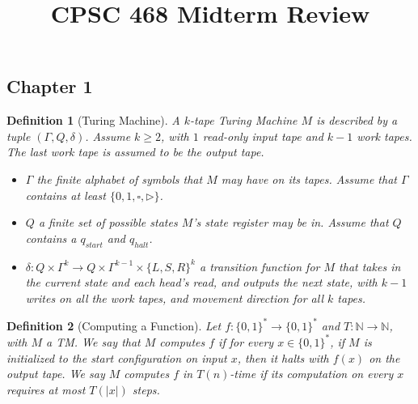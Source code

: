 \documentclass[10pt]{article}
\title{CPSC 468 Midterm Review}
\author{}
\date{}
\newtheorem{definition}{Definition}[section]
\begin{document}
\maketitle

\newcommand{\E}{\mathrm{E}}
\newcommand{\Var}{\mathrm{Var}}
\newcommand{\Real}{\mathrm{Re}}
\newcommand{\Imag}{\mathrm{Im}}
\newcommand{\res}{\mathrm{res}}
\newcommand{\NP}{\mathrm{NP}}
\newcommand{\NPC}{\mathrm{NP\mhyphen Complete}}
\newcommand{\coNP}{\mathrm{coNP}}
\newcommand{\coNPC}{\mathrm{coNP\mhyphen Complete}}
\newcommand{\DP}{\mathrm{DP}}
\newcommand{\PTIME}{\mathrm{P}}
\newcommand{\AL}{\mathrm{AL}}
\newcommand{\INDSET}{\mathrm{INDSET}}
\newcommand{\NOTINDSET}{\overline{\mathrm{INDSET}}}
\newcommand{\EXACTINDSET}{\mathrm{EXACT\mhyphen INDSET}}
\newcommand{\SAT}{\mathrm{SAT}}
\newcommand{\UNSAT}{\overline{\mathrm{SAT}}}
\newcommand{\ACCEPT}{\mathrm{ACCEPT}}
\newcommand{\REJECT}{\mathrm{REJECT}}

\subsection*{Chapter 1}
\begin{definition}[Turing Machine]
  A $k$-tape Turing Machine $M$ is described by a tuple $(\Gamma, Q, \delta)$.
  Assume $k \geq 2$, with $1$ read-only input tape and $k - 1$ work tapes.
  The last work tape is assumed to be the output tape.
  \begin{itemize}
    \item
      $\Gamma$ the finite alphabet of symbols that $M$ may have on its tapes.
      Assume that $\Gamma$ contains at least $\{0,1,\square,\triangleright\}$.

    \item
      $Q$ a finite set of possible states $M$'s state register may be in.
      Assume that $Q$ contains a $q_{start}$ and $q_{halt}$.

    \item
      $\delta : Q \times \Gamma^k \to Q
      \times \Gamma^{k - 1} \times \{L, S, R\}^k$ a transition function for
      $M$ that takes in the current state and each head's read, and outputs
      the next state, with $k - 1$ writes on all the work tapes, and movement
      direction for all $k$ tapes.
  \end{itemize}
\end{definition}

\begin{definition}[Computing a Function]
  Let $f : \{0, 1\}^\ast \to \{0, 1\}^\ast$ and
  $T : \mathbb{N} \to \mathbb{N}$, with $M$ a TM.
  We say that $M$ computes $f$ if for every $x \in \{0, 1\}^\ast$, if
  $M$ is initialized to the start configuration on input $x$, then it halts
  with $f(x)$ on the output tape.
  We say $M$ computes $f$ in $T(n)$-time if its computation on every
  $x$ requires at most $T(|x|)$ steps.
\end{definition}
\end{document}
